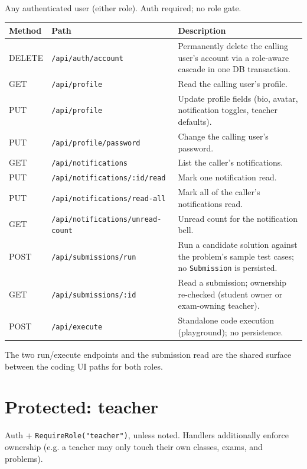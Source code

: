Any authenticated user (either role). Auth required; no role gate.

\begin{xltabular}{\linewidth}{l >{\ttfamily\small\raggedright\arraybackslash}p{5.6cm} X}
  \toprule
  Method & Path & Description \\
  \midrule
  DELETE & \texttt{/api/auth/account}               & Permanently delete the calling user's account via a role-aware cascade in one DB transaction. \\
  GET    & \texttt{/api/profile}                    & Read the calling user's profile. \\
  PUT    & \texttt{/api/profile}                    & Update profile fields (bio, avatar, notification toggles, teacher defaults). \\
  PUT    & \texttt{/api/profile/password}           & Change the calling user's password. \\
  GET    & \texttt{/api/notifications}              & List the caller's notifications. \\
  PUT    & \texttt{/api/notifications/:id/read}     & Mark one notification read. \\
  PUT    & \texttt{/api/notifications/read-all}     & Mark all of the caller's notifications read. \\
  GET    & \texttt{/api/notifications/unread-count} & Unread count for the notification bell. \\
  POST   & \texttt{/api/submissions/run}            & Run a candidate solution against the problem's sample test cases; no \texttt{Submission} is persisted. \\
  GET    & \texttt{/api/submissions/:id}            & Read a submission; ownership re-checked (student owner or exam-owning teacher). \\
  POST   & \texttt{/api/execute}                    & Standalone code execution (playground); no persistence. \\
  \bottomrule
\end{xltabular}

The two run/execute endpoints and the submission read are the shared surface between the coding UI paths for both roles.

\section{Protected: teacher}

Auth + \texttt{RequireRole("teacher")}, unless noted. Handlers additionally enforce ownership (e.g. a teacher may only touch their own classes, exams, and problems).

